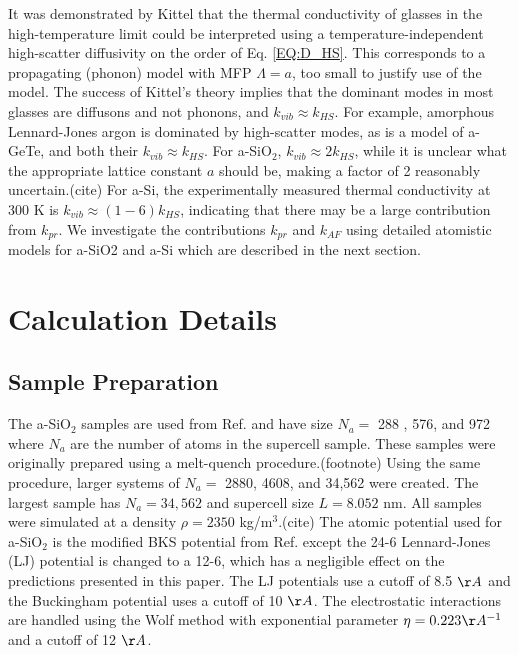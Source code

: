 \documentclass[aps,prb,onecolumn,preprint,superscriptaddress,footinbib,amsmath,amssymb,floatfix]{revtex4}
\begin{document}
It was demonstrated by Kittel that  
the thermal conductivity of glasses in the high-temperature limit could 
be interpreted 
using a temperature-independent high-scatter diffusivity on the order 
of Eq. \eqref{EQ:D_HS}.\cite{kittel_interpretation_1949}  
This corresponds to a propagating (phonon) model with MFP $\Lambda = a$, 
too small to justify use of the model. The success of Kittel's theory 
implies that the dominant 
modes in most glasses are diffusons and not phonons, and  
$k_{vib} \approx k_{HS}$.
\cite{kittel_interpretation_1949,graebner_phonon_1986}  
For example, amorphous Lennard-Jones argon is dominated 
by high-scatter modes,\cite{larkin_predicting_2013} as is a model of 
a-GeTe,\cite{sosso_thermal_2012} and both their $k_{vib} \approx k_{HS}$. 
For a-SiO$_2$, $k_{vib} \approx 2k_{HS}$, while it is unclear what the 
appropriate lattice constant $a$ should be, making a factor of 
2 reasonably uncertain.(cite) 
For a-Si, the experimentally measured thermal conductivity at 
300 K is $k_{vib} \approx (1-6) k_{HS}$,\cite{cahill_lower_1992}  
indicating that there may be a large contribution from $k_{pr}$. 
We investigate the contributions $k_{pr}$ and $k_{AF}$ using 
detailed atomistic models for a-SiO2 and a-Si which are 
described in the next section. 

\section{\label{S:Calculation}Calculation Details}

\subsection{\label{S:Sample}Sample Preparation}

The a-SiO$_2$ samples are used from Ref.  
and have size $N_a =$ 288 , 576, and 972 where $N_a$ are the number of 
atoms in the supercell sample. These samples were 
originally prepared using a melt-quench procedure.(footnote) 
Using the same procedure, larger systems of 
$N_a = $ 2880, 4608, and 34,562 were created. The largest sample 
has $N_a = 34,562$ and supercell size $L=8.052$ nm. All samples were 
simulated at a density $\rho=2350$ kg/m$^3$.(cite) 
The atomic potential used 
for a-SiO$_2$ is the modified BKS potential from Ref. 
 except the 24-6 
Lennard-Jones (LJ) potential is changed to a 12-6, 
which has a negligible effect on the predictions presented in this paper. 
The LJ potentials use a cutoff of 8.5 $\AA$ and the Buckingham 
potential uses a cutoff of 10 $\AA$. 
The electrostatic interactions are handled using the Wolf method with 
exponential parameter $\eta=0.223 \AA^{-1}$ and a cutoff of 12 $\AA$.
\cite{gale_general_2003} 
\end{document}
